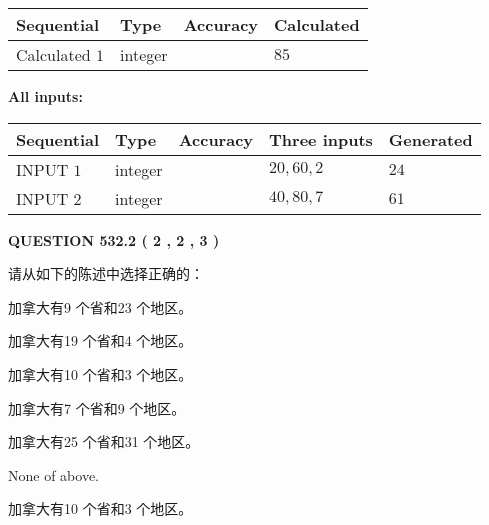 \documentclass{ctexart}
\begin{document}
  
\noindent\begin{tabular}{|l|l|l|l|}
\hline
 Sequential & Type & Accuracy & Calculated \\ 
\hline
 
 
  Calculated $  1 $ & integer &  & 
  $ 85 $ 
 \\  \hline  
 \end{tabular}
   
   
   
   
\noindent\vspace{0.1in}\hspace{-0.08in} {\textbf{\Large{All inputs: }}}
   
   
  
  
\noindent\begin{tabular}{|l|l|l|l|l|}
\hline
 Sequential & Type & Accuracy & Three inputs & Generated \\ 
\hline
 
 
  INPUT $  1 $ & integer &  & $
 20
 , 
 60
 , 
 2
 $ & $ 24 $ 
 \\  \hline  
 
 
  INPUT $  2 $ & integer &  & $
 40
 , 
 80
 , 
 7
 $ & $ 61 $ 
 \\  \hline  
 \end{tabular}
   
   
  
\vspace{0.2in}
  
{\textbf{\Large{QUESTION
532.2 
 ( 2 , 2 , 3 )
}}}
  
  
请从如下的陈述中选择正确的：
 
 
加拿大有9 个省和23 个地区。
 
 
加拿大有19 个省和4 个地区。
 
 
加拿大有10 个省和3 个地区。
 
 
加拿大有7 个省和9 个地区。
 
 
加拿大有25 个省和31 个地区。
 
 
 None of above.
 
 
\noindent{}
 
 
加拿大有10 个省和3 个地区。
 
 
\noindent{}
 
\end{document}

